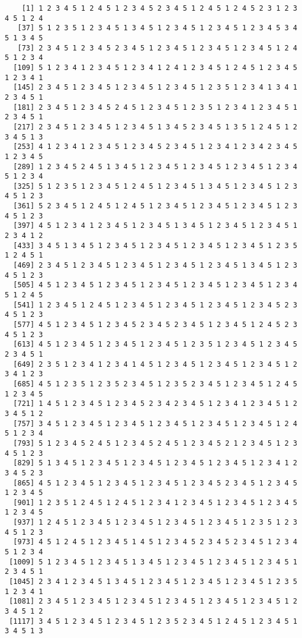 \documentclass[
  11pt,
]{book}
\begin{document}
\begin{verbatim}
    [1] 1 2 3 4 5 1 2 4 5 1 2 3 4 5 2 3 4 5 1 2 4 5 1 2 4 5 2 3 1 2 3 4 5 1 2 4
   [37] 5 1 2 3 5 1 2 3 4 5 1 3 4 5 1 2 3 4 5 1 2 3 4 5 1 2 3 4 5 3 4 5 1 3 4 5
   [73] 2 3 4 5 1 2 3 4 5 2 3 4 5 1 2 3 4 5 1 2 3 4 5 1 2 3 4 5 1 2 4 5 1 2 3 4
  [109] 5 1 2 3 4 1 2 3 4 5 1 2 3 4 1 2 4 1 2 3 4 5 1 2 4 5 1 2 3 4 5 1 2 3 4 1
  [145] 2 3 4 5 1 2 3 4 5 1 2 3 4 5 1 2 3 4 5 1 2 3 5 1 2 3 4 1 3 4 1 2 3 4 5 1
  [181] 2 3 4 5 1 2 3 4 5 2 4 5 1 2 3 4 5 1 2 3 5 1 2 3 4 1 2 3 4 5 1 2 3 4 5 1
  [217] 2 3 4 5 1 2 3 4 5 1 2 3 4 5 1 3 4 5 2 3 4 5 1 3 5 1 2 4 5 1 2 3 4 5 1 3
  [253] 4 1 2 3 4 1 2 3 4 5 1 2 3 4 5 2 3 4 5 1 2 3 4 1 2 3 4 2 3 4 5 1 2 3 4 5
  [289] 1 2 3 4 5 2 4 5 1 3 4 5 1 2 3 4 5 1 2 3 4 5 1 2 3 4 5 1 2 3 4 5 1 2 3 4
  [325] 5 1 2 3 5 1 2 3 4 5 1 2 4 5 1 2 3 4 5 1 3 4 5 1 2 3 4 5 1 2 3 4 5 1 2 3
  [361] 5 2 3 4 5 1 2 4 5 1 2 4 5 1 2 3 4 5 1 2 3 4 5 1 2 3 4 5 1 2 3 4 5 1 2 3
  [397] 4 5 1 2 3 4 1 2 3 4 5 1 2 3 4 5 1 3 4 5 1 2 3 4 5 1 2 3 4 5 1 2 3 4 1 2
  [433] 3 4 5 1 3 4 5 1 2 3 4 5 1 2 3 4 5 1 2 3 4 5 1 2 3 4 5 1 2 3 5 1 2 4 5 1
  [469] 2 3 4 5 1 2 3 4 5 1 2 3 4 5 1 2 3 4 5 1 2 3 4 5 1 3 4 5 1 2 3 4 5 1 2 3
  [505] 4 5 1 2 3 4 5 1 2 3 4 5 1 2 3 4 5 1 2 3 4 5 1 2 3 4 5 1 2 3 4 5 1 2 4 5
  [541] 1 2 3 4 5 1 2 4 5 1 2 3 4 5 1 2 3 4 5 1 2 3 4 5 1 2 3 4 5 2 3 4 5 1 2 3
  [577] 4 5 1 2 3 4 5 1 2 3 4 5 2 3 4 5 2 3 4 5 1 2 3 4 5 1 2 4 5 2 3 4 5 1 2 3
  [613] 4 5 1 2 3 4 5 1 2 3 4 5 1 2 3 4 5 1 2 3 5 1 2 3 4 5 1 2 3 4 5 2 3 4 5 1
  [649] 2 3 5 1 2 3 4 1 2 3 4 1 4 5 1 2 3 4 5 1 2 3 4 5 1 2 3 4 5 1 2 3 4 1 2 3
  [685] 4 5 1 2 3 5 1 2 3 5 2 3 4 5 1 2 3 5 2 3 4 5 1 2 3 4 5 1 2 4 5 1 2 3 4 5
  [721] 1 4 5 1 2 3 4 5 1 2 3 4 5 2 3 4 2 3 4 5 1 2 3 4 1 2 3 4 5 1 2 3 4 5 1 2
  [757] 3 4 5 1 2 3 4 5 1 2 3 4 5 1 2 3 4 5 1 2 3 4 5 1 2 3 4 5 1 2 4 5 1 2 3 4
  [793] 5 1 2 3 4 5 2 4 5 1 2 3 4 5 2 4 5 1 2 3 4 5 2 1 2 3 4 5 1 2 3 4 5 1 2 3
  [829] 5 1 3 4 5 1 2 3 4 5 1 2 3 4 5 1 2 3 4 5 1 2 3 4 5 1 2 3 4 1 2 3 4 5 2 3
  [865] 4 5 1 2 3 4 5 1 2 3 4 5 1 2 3 4 5 1 2 3 4 5 2 3 4 5 1 2 3 4 5 1 2 3 4 5
  [901] 1 2 3 5 1 2 4 5 1 2 4 5 1 2 3 4 1 2 3 4 5 1 2 3 4 5 1 2 3 4 5 1 2 3 4 5
  [937] 1 2 4 5 1 2 3 4 5 1 2 3 4 5 1 2 3 4 5 1 2 3 4 5 1 2 3 5 1 2 3 4 5 1 2 3
  [973] 4 5 1 2 4 5 1 2 3 4 5 1 4 5 1 2 3 4 5 2 3 4 5 2 3 4 5 1 2 3 4 5 1 2 3 4
 [1009] 5 1 2 3 4 5 1 2 3 4 5 1 3 4 5 1 2 3 4 5 1 2 3 4 5 1 2 3 4 5 1 2 3 4 5 1
 [1045] 2 3 4 1 2 3 4 5 1 3 4 5 1 2 3 4 5 1 2 3 4 5 1 2 3 4 5 1 2 3 5 1 2 3 4 1
 [1081] 2 3 4 5 1 2 3 4 5 1 2 3 4 5 1 2 3 4 5 1 2 3 4 5 1 2 3 4 5 1 2 3 4 5 1 2
 [1117] 3 4 5 1 2 3 4 5 1 2 3 4 5 1 2 3 5 2 3 4 5 1 2 4 5 1 2 3 4 5 1 3 4 5 1 3

\end{verbatim}
\end{document}
